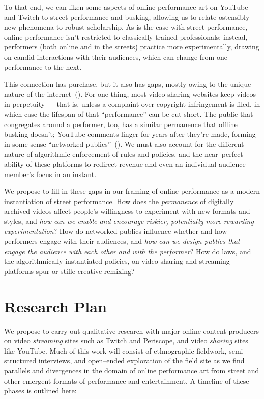 \documentclass[10pt]{article}
\begin{document}
To that end, we can liken some aspects of online performance art on YouTube and Twitch
to street performance and busking,
allowing us to relate ostensibly new phenomena to robust scholarship.
As is the case with street performance,
online performance isn't restricted to classically trained professionals;
instead, performers (both online and in the streets) practice more experimentally,
drawing on candid interactions with their audiences,
which can change from one performance to the next.

This connection has purchase, but it also has gaps,
mostly owing to the unique nature of the internet~(\cite{miller2011understanding}).
For one thing, most video sharing websites keep videos
in perpetuity
--- that is, unless a complaint over copyright infringement is filed, in which case the lifespan of that ``performance'' can be cut short.
The public that congregates around a performer, too, has a similar permanence that offline busking doesn't;
YouTube comments linger for years after they're made, forming in some sense ``networked publics''~(\cite{boyd2007youth}).
We must also account for the different nature of algorithmic enforcement of rules and policies, and
the near--perfect ability of these platforms to redirect revenue and
even an individual audience member's focus in an instant.

We propose to fill in these gaps in our framing of online performance as a modern instantiation of street performance.
How does the \textit{permanence} of digitally archived videos affect people's willingness to experiment with new formats and styles,
and \textit{how can we enable and encourage riskier, potentially more rewarding experimentation}?
How do networked publics influence whether and how performers engage with their audiences,
and \textit{how can we design publics that engage the audience with each other and with the performer}?
How do laws, and the algorithmically instantiated policies, on video sharing and streaming platforms spur or stifle creative remixing?

\section*{Research Plan}
We propose to carry out qualitative research with major online content producers
on video \textit{streaming} sites such as Twitch and Periscope, and video \textit{sharing} sites like YouTube.
Much of this work will consist of ethnographic fieldwork, semi--structured interviews, and
open--ended exploration of the field site as we find parallels and divergences in the domain
of online performance art from street and other emergent formats of performance and entertainment.
A timeline of these phases is outlined here:
\end{document}
